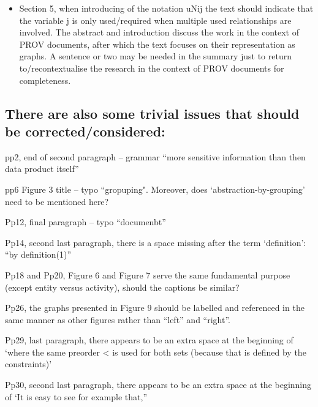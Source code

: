 \documentclass{article}
\begin{document}
\begin{itemize}
\item Section 5, when introducing of the notation uNij the text should indicate that the variable j is only used/required when multiple used relationships are involved.
The abstract and introduction discuss the work in the context of PROV documents, after which the text focuses on their representation as graphs.  A sentence or two may be needed in the summary just to return to/recontextualise the research in the context of PROV documents for completeness.

\end{itemize}

\subsection*{There are also some trivial issues that should be corrected/considered:}

pp2, end of second paragraph – grammar “more sensitive information than then data product itself”

pp6 Figure 3 title – typo “gropuping".  Moreover, does ‘abstraction-by-grouping’ need to 
be mentioned here?

Pp12, final paragraph – typo “documenbt”

Pp14, second last paragraph, there is a space missing after the term ‘definition’: “by definition(1)”

Pp18 and Pp20, Figure 6 and Figure 7 serve the same fundamental purpose (except entity versus activity), should the captions be similar?

Pp26, the graphs presented in Figure 9 should be labelled and referenced in the same manner as other figures rather than “left” and “right”.

Pp29, last paragraph, there appears to be an extra space at the beginning of ‘where the same preorder < is used for both sets (because that is defined by the constraints)’

Pp30, second last paragraph, there appears to be an extra space at the beginning of ‘It is easy to see for example that,”






\end{document}
